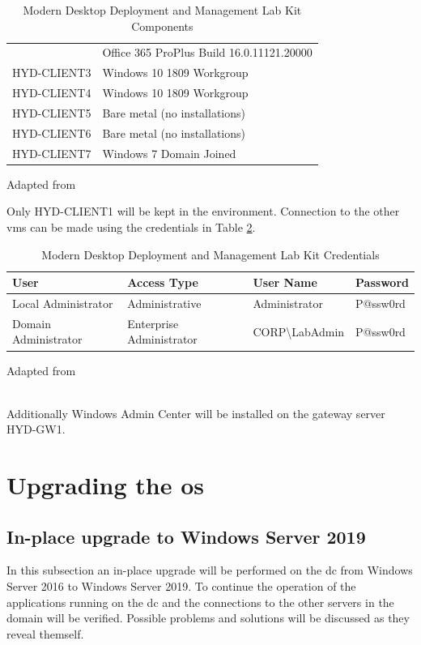 \begin{table}[ht]
\begin{adjustbox}{width=1\textwidth}
\begin{tabular}{l|l}
		& Office 365 ProPlus Build 16.0.11121.20000                           									 \\
		HYD-CLIENT3  & Windows 10 1809 Workgroup                                         						  \\
		HYD-CLIENT4  & Windows 10 1809 Workgroup                                          						   \\
		HYD-CLIENT5 & Bare metal (no installations)                                      						    \\
		HYD-CLIENT6 & Bare metal (no installations)                                       							 \\
		HYD-CLIENT7  & Windows 7 Domain Joined                                            
	\end{tabular}
	\end{adjustbox}
	\caption[Lab Kit Components]{Modern Desktop Deployment and Management Lab Kit Components}
	\scriptsize	
	Adapted from \cite{MicrosoftCorporation2019}
	\label{tab:MDDMLK2016}
\end{table}

	
Only HYD-CLIENT1 will be kept in the environment. Connection to the other \acrshort{vm}s can be made using the credentials in Table \ref{tab:MDDMLKC2016}.
\begin{table}[ht]
	\centering
	\begin{adjustbox}{width=1\textwidth}
	\begin{tabular}{l|lll}
		User                 & Access Type              & User Name                    & Password \\
		\hline
		Local Administrator  & Administrative           & Administrator                & P@ssw0rd \\
		Domain Administrator & Enterprise Administrator & CORP\textbackslash{}LabAdmin & P@ssw0rd
	\end{tabular}
	\end{adjustbox}
	\caption[Lab Kit Credentials]{Modern Desktop Deployment and Management Lab Kit Credentials}
	\scriptsize	
	Adapted from \cite{MicrosoftCorporation2019}
	\label{tab:MDDMLKC2016}
\end{table}
\\
Additionally Windows Admin Center will be installed on the gateway server HYD-GW1. 
\section{Upgrading the \acrshort{os}}
\subsection{In-place upgrade to Windows Server 2019}
In this subsection an in-place upgrade will be performed on the \acrfull{dc} from Windows Server 2016 to Windows Server 2019. To continue the operation of the applications running on the \acrshort{dc} and the connections to the other servers in the domain will be verified. Possible problems and solutions will be discussed as they reveal themself.
